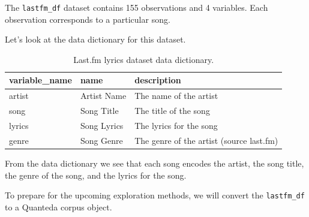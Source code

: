 \documentclass[
]{article}
\newenvironment{Shaded}{\begin{snugshade}}{\end{snugshade}}
\newcommand{\CommentTok}[1]{\textcolor[rgb]{0.56,0.35,0.01}{\textit{#1}}}
\newcommand{\FunctionTok}[1]{\textcolor[rgb]{0.00,0.00,0.00}{#1}}
\newcommand{\NormalTok}[1]{#1}
\begin{document}
\begin{Shaded}
\end{Shaded}

The \texttt{lastfm\_df} dataset contains 155 observations and 4 variables. Each observation corresponds to a particular song.

Let's look at the data dictionary for this dataset.

\begin{table}

\caption{\label{tab:eda-lastfm-data-dictionary-preview}Last.fm lyrics dataset data dictionary.}
\centering
\begin{tabular}[t]{lll}
\toprule
variable\_name & name & description\\
\midrule
artist & Artist Name & The name of the artist\\
song & Song Title & The title of the song\\
lyrics & Song Lyrics & The lyrics for the song\\
genre & Song Genre & The genre of the artist (source last.fm)\\
\bottomrule
\end{tabular}
\end{table}

From the data dictionary we see that each song encodes the artist, the song title, the genre of the song, and the lyrics for the song.

To prepare for the upcoming exploration methods, we will convert the \texttt{lastfm\_df} to a Quanteda corpus object.
\end{document}
